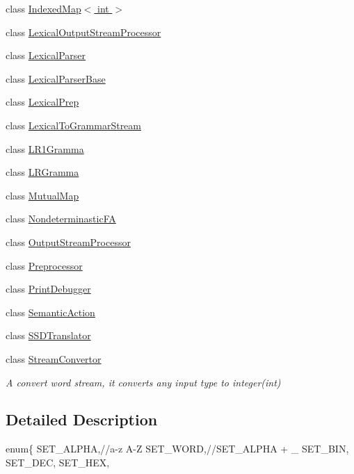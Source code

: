 \begin{DoxyCompactItemize}
class \hyperlink{classx2_1_1_indexed_map_3_01int_01_4}{Indexed\+Map$<$ int $>$}
\item 
class \hyperlink{classx2_1_1_lexical_output_stream_processor}{Lexical\+Output\+Stream\+Processor}
\item 
class \hyperlink{classx2_1_1_lexical_parser}{Lexical\+Parser}
\item 
class \hyperlink{classx2_1_1_lexical_parser_base}{Lexical\+Parser\+Base}
\item 
class \hyperlink{classx2_1_1_lexical_prep}{Lexical\+Prep}
\item 
class \hyperlink{classx2_1_1_lexical_to_grammar_stream}{Lexical\+To\+Grammar\+Stream}
\item 
class \hyperlink{classx2_1_1_l_r1_gramma}{L\+R1\+Gramma}
\item 
class \hyperlink{classx2_1_1_l_r_gramma}{L\+R\+Gramma}
\item 
class \hyperlink{classx2_1_1_mutual_map}{Mutual\+Map}
\item 
class \hyperlink{classx2_1_1_nondeterminastic_f_a}{Nondeterminastic\+FA}
\item 
class \hyperlink{classx2_1_1_output_stream_processor}{Output\+Stream\+Processor}
\item 
class \hyperlink{classx2_1_1_preprocessor}{Preprocessor}
\item 
class \hyperlink{classx2_1_1_print_debugger}{Print\+Debugger}
\item 
class \hyperlink{classx2_1_1_semantic_action}{Semantic\+Action}
\item 
class \hyperlink{classx2_1_1_s_s_d_translator}{S\+S\+D\+Translator}
\item 
class \hyperlink{classx2_1_1_stream_convertor}{Stream\+Convertor}
\begin{DoxyCompactList}\small\item\em A convert word stream, it converts any input type to integer(int) \end{DoxyCompactList}\end{DoxyCompactItemize}


\subsection{Detailed Description}
enum\{ S\+E\+T\+\_\+\+A\+L\+P\+HA,//a-\/z A-\/Z S\+E\+T\+\_\+\+W\+O\+RD,//\+S\+E\+T\+\_\+\+A\+L\+P\+HA + \+\_\+ S\+E\+T\+\_\+\+B\+IN, S\+E\+T\+\_\+\+D\+EC, S\+E\+T\+\_\+\+H\+EX, 